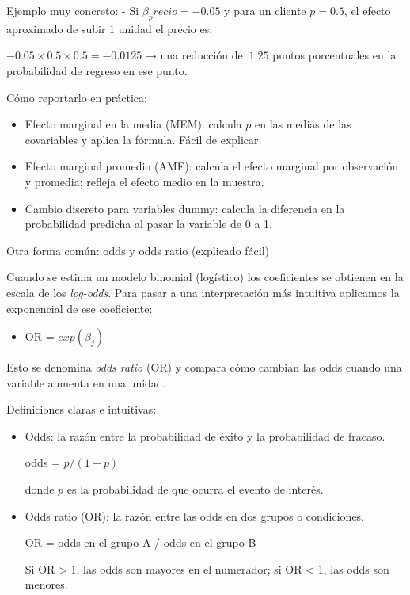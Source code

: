 \documentclass[
  spanish,
  letterpaper,
  DIV=11,
  numbers=noendperiod]{scrreprt}
\providecommand{\tightlist}{%
  \setlength{\itemsep}{0pt}\setlength{\parskip}{0pt}}
\begin{document}
Ejemplo muy concreto: - Si \(β_precio = -0.05\) y para un cliente
\(p = 0.5\), el efecto aproximado de subir 1 unidad el precio es:

\(-0.05 × 0.5 × 0.5 = -0.0125\) → una reducción de \(~1.25\) puntos
porcentuales en la probabilidad de regreso en ese punto.

Cómo reportarlo en práctica:

\begin{itemize}
\tightlist
\item
  Efecto marginal en la media (MEM): calcula \(p\) en las medias de las
  covariables y aplica la fórmula. Fácil de explicar.
\item
  Efecto marginal promedio (AME): calcula el efecto marginal por
  observación y promedia; refleja el efecto medio en la muestra.
\item
  Cambio discreto para variables dummy: calcula la diferencia en la
  probabilidad predicha al pasar la variable de 0 a 1.
\end{itemize}

Otra forma común: odds y odds ratio (explicado fácil)

Cuando se estima un modelo binomial (logístico) los coeficientes se
obtienen en la escala de los \emph{log-odds}. Para pasar a una
interpretación más intuitiva aplicamos la exponencial de ese
coeficiente:

\begin{itemize}
\tightlist
\item
  OR = \(exp(β_j)\)
\end{itemize}

Esto se denomina \emph{odds ratio} (OR) y compara cómo cambian las odds
cuando una variable aumenta en una unidad.

Definiciones claras e intuitivas:

\begin{itemize}
\item
  Odds: la razón entre la probabilidad de éxito y la probabilidad de
  fracaso.

  odds = \(p / (1 - p)\)

  donde \(p\) es la probabilidad de que ocurra el evento de interés.
\item
  Odds ratio (OR): la razón entre las odds en dos grupos o condiciones.

  OR = odds en el grupo A / odds en el grupo B

  Si OR \textgreater{} 1, las odds son mayores en el numerador; si OR
  \textless{} 1, las odds son menores.
\end{itemize}
\end{document}
